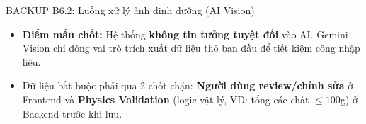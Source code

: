 \documentclass[10pt, aspectratio=169]{beamer}
\begin{document}
\begin{frame}[label=b6_2]{BACKUP B6.2: Luồng xử lý ảnh dinh dưỡng (AI Vision)}
\begin{center}
{
    }
    \end{center}
    
    \vspace{0.4cm}
    \begin{itemize}
        \small
        \item \textbf{Điểm mấu chốt:} Hệ thống \textbf{không tin tưởng tuyệt đối} vào AI. Gemini Vision chỉ đóng vai trò trích xuất dữ liệu thô ban đầu để tiết kiệm công nhập liệu.
        \item Dữ liệu bắt buộc phải qua 2 chốt chặn: \textbf{Người dùng review/chỉnh sửa} ở Frontend và \textbf{Physics Validation} (logic vật lý, VD: tổng các chất $\le 100$g) ở Backend trước khi lưu.
    \end{itemize}
\end{frame}
\end{document}
